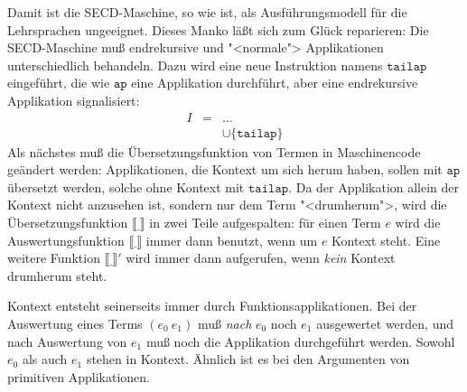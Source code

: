 %
Damit ist die SECD-Maschine, so wie ist, als Ausführungsmodell für
die Lehrsprachen ungeeignet.  Dieses Manko läßt sich zum Glück reparieren: Die
SECD-Maschine muß endrekursive und "<normale"> Applikationen
unterschiedlich behandeln.  Dazu wird eine neue Instruktion namens
$\mathtt{tailap}$ eingeführt, die wie $\mathtt{ap}$ eine Applikation
durchführt, aber eine endrekursive Applikation signalisiert:
%
\begin{eqnarray*}
  I &=& \ldots\\
  &&\cup \{ \mathtt{tailap} \}
\end{eqnarray*}
%
Als nächstes muß die Übersetzungsfunktion von Termen in Maschinencode
geändert werden:  Applikationen, die Kontext um sich herum haben,
sollen mit $\mathtt{ap}$ übersetzt werden, solche ohne Kontext mit
$\mathtt{tailap}$.  Da der Applikation allein der Kontext nicht
anzusehen ist, sondern nur dem Term "<drumherum">, wird die
Übersetzungsfunktion $\llbracket \underline{~} \rrbracket$ in zwei
Teile aufgespalten: für einen Term $e$ wird die Auswertungsfunktion $\llbracket\underline{~}\rrbracket$ immer dann benutzt, wenn um $e$ Kontext steht.  Eine
weitere Funktion $\llbracket \underline{~} \rrbracket'$ wird immer
dann aufgerufen, wenn \emph{kein} Kontext drumherum steht.

Kontext entsteht seinerseits immer durch Funktionsapplikationen.  Bei
der Auswertung eines Terms $(e_0~e_1)$ muß \emph{nach} $e_0$ noch
$e_1$ ausgewertet werden, und nach Auswertung von $e_1$ muß noch die
Applikation durchgeführt werden.  Sowohl $e_0$ als auch $e_1$ stehen
in Kontext.  Ähnlich ist es bei den Argumenten von primitiven
Applikationen.


